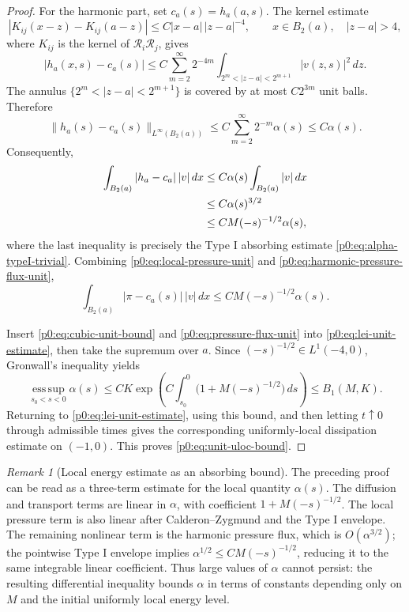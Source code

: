 \documentclass[11pt]{amsart}
\theoremstyle{plain}
\theoremstyle{definition}
\theoremstyle{remark}
\newtheorem{remark}[remark]{Remark}
\numberwithin{equation}{section}
\begin{document}
\begin{proof}
For the harmonic part, set \(c_a(s)=h_a(a,s)\).  The kernel estimate
\[
  |K_{ij}(x-z)-K_{ij}(a-z)|
  \le C |x-a|\,|z-a|^{-4},
  \qquad x\in B_2(a),\quad |z-a|>4,
\]
where \(K_{ij}\) is the kernel of \(\mathcal R_i\mathcal R_j\), gives
\[
  |h_a(x,s)-c_a(s)|
  \le
  C\sum_{m=2}^{\infty}2^{-4m}
    \int_{2^m<|z-a|<2^{m+1}} |v(z,s)|^2\,dz .
\]
The annulus \(\{2^m<|z-a|<2^{m+1}\}\) is covered by at most \(C2^{3m}\)
unit balls.  Therefore
\begin{equation}\label{p0:eq:harmonic-pressure-unit}
  \|h_a(s)-c_a(s)\|_{L^\infty(B_2(a))}
  \le C\sum_{m=2}^{\infty}2^{-m}\alpha(s)
  \le C\alpha(s).
\end{equation}
Consequently,
\begin{align}
  \int_{B_2(a)} |h_a-c_a|\,|v|\,dx
  &\le C\alpha(s)\int_{B_2(a)} |v|\,dx                    \notag\\
  &\le C\alpha(s)^{3/2}                                    \notag\\
  &\le C M(-s)^{-1/2}\alpha(s),
\label{p0:eq:harmonic-pressure-flux-unit}
\end{align}
where the last inequality is precisely the Type I absorbing estimate
\eqref{p0:eq:alpha-typeI-trivial}.
Combining \eqref{p0:eq:local-pressure-unit} and
\eqref{p0:eq:harmonic-pressure-flux-unit},
\begin{equation}\label{p0:eq:pressure-flux-unit}
  \int_{B_2(a)} |\pi-c_a(s)|\,|v|\,dx
  \le C M(-s)^{-1/2}\alpha(s).
\end{equation}

Insert \eqref{p0:eq:cubic-unit-bound} and \eqref{p0:eq:pressure-flux-unit} into
\eqref{p0:eq:lei-unit-estimate}, then take the supremum over \(a\).  Since
\((-s)^{-1/2}\in L^1(-4,0)\), Gronwall's inequality yields
\[
  \operatorname*{ess\,sup}_{s_0<s<0}\alpha(s)
  \le C K
     \exp\left(C\int_{s_0}^{0}\bigl(1+M(-s)^{-1/2}\bigr)\,ds\right)
  \le B_1(M,K).
\]
Returning to \eqref{p0:eq:lei-unit-estimate}, using this bound, and then letting
\(t\uparrow0\) through admissible times gives the corresponding
uniformly-local dissipation estimate on \((-1,0)\).  This proves
\eqref{p0:eq:unit-uloc-bound}.
\end{proof}

\begin{remark}[Local energy estimate as an absorbing bound]
\label{p0:rem:state-space-stratification}
The preceding proof can be read as a three-term estimate for the local quantity
\(\alpha(s)\).  The diffusion and transport terms are linear in
\(\alpha\), with coefficient \(1+M(-s)^{-1/2}\).  The local pressure term is
also linear after Calderon--Zygmund and the Type I envelope.  The remaining
nonlinear term is the harmonic pressure flux, which is
\(O(\alpha^{3/2})\); the pointwise Type I envelope implies
\(\alpha^{1/2}\le C M(-s)^{-1/2}\), reducing it to the same integrable linear
coefficient.  Thus large values of \(\alpha\) cannot persist: the resulting
differential inequality bounds \(\alpha\) in terms of constants depending
only on \(M\) and the initial uniformly local energy level.
\end{remark}
\end{document}
